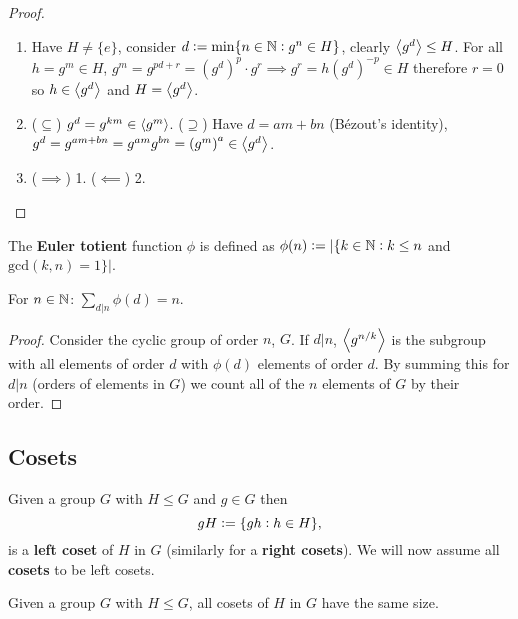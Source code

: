 \documentclass[../Year1/Year1.tex]{subfiles}
\begin{document}
\begin{proof}
    \begin{enumerate}
        \item  Have $H\neq\{e\}$, consider $d:=\min\{n\in\mathbb{N}:g^n\in H\}$, clearly $\left\langle g^d \right\rangle\leq H$. For all $h=g^m\in H$, $g^m=g^{pd+r}={(g^d)}^p\cdot g^r\implies g^r=h{(g^d)}^{-p}\in H$ therefore $r=0$ so $h\in\left\langle g^d \right\rangle$ and $H=\left\langle g^d \right\rangle$.
        \item ($\subseteq$) $g^d=g^{km}\in\left\langle g^m \right\rangle$. ($\supseteq$) Have $d=am+bn$ (Bézout's identity), $g^d = g^{am+bn}=g^{am}g^{bn}={(g^m)}^a\in\left\langle g^d \right\rangle$.
        \item ($\implies$) 1. ($\impliedby$) 2.
    \end{enumerate}
\end{proof}

\begin{definition}
    The \textbf{Euler totient} function $\phi$ is defined as $\phi(n):=|\{k\in\mathbb{N}: k\leq n$ and $\text{gcd}(k,n)=1\}|$.
\end{definition}

\vspace{-5pt}

\begin{corollary}
    For $n\in\mathbb{N}$: \hfil $\displaystyle\sum_{d|n}\phi(d) = n$.
\end{corollary}

\vspace{-15pt}

\begin{proof}
    Consider the cyclic group of order $n$, $G$. If $d|n$, $\left\langle g^{n/k} \right\rangle$ is the subgroup with all elements of order $d$ with $\phi(d)$ elements of order $d$. By summing this for $d|n$ (orders of elements in $G$) we count all of the $n$ elements of $G$ by their order.
\end{proof}

\subsection{Cosets}

\begin{definition}[Coset]
    Given a group $G$ with $H\leq G$ and $g\in G$ then \[
    gH := \{gh: h\in H\}
    \textcolor{black}{,}
    \]
    is a \textbf{left coset} of $H$ in $G$ (similarly for a \textbf{right cosets}). We will now assume all \textbf{cosets} to be left cosets.
\end{definition}

\begin{lemma}
    Given a group $G$ with $H\leq G$, all cosets of $H$ in $G$ have the same size.
\end{lemma}
\end{document}
